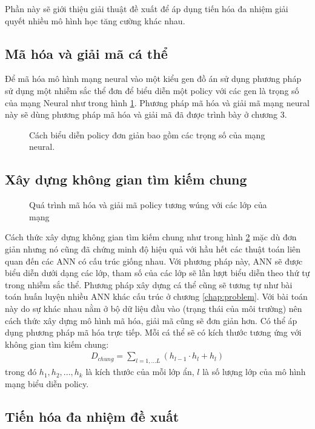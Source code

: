 \label{chap:propose}
Phần này sẽ giới thiệu giải thuật đề xuất để áp dụng tiến hóa đa nhiệm giải quyết nhiều mô hình học tăng cường khác nhau.
\subsection{Mã hóa và giải mã cá thể}
Để mã hóa mô hình mạng neural vào một kiểu gen đồ án sử dụng phương pháp sử dụng một nhiễm sắc thể đơn để biểu diễn một policy với các gen là trọng số của mạng Neural như trong hình \ref{fig:problem:policy}. Phương pháp mã hóa và giải mã mạng neural này sẽ dùng phương pháp mã hóa và giải mã đã được trình bày ở chương 3.
\begin{figure}[ht]
    \centering
    \caption{Cách biểu diễn policy đơn giản bao gồm các trọng số của mạng neural.}
    \label{fig:problem:policy}
\end{figure}


\subsection{Xây dựng không gian tìm kiếm chung}
\begin{figure}[ht]
    \centering
    \caption{Quá trình mã hóa và giải mã policy tương wúng với các lớp của mạng}
    \label{fig:problem:policy-decode}
\end{figure}

Cách thức xây dựng không gian tìm kiếm chung như trong hình \ref{fig:problem:policy-decode} mặc dù đơn giản nhưng nó cũng đã chứng minh độ hiệu quả với hầu hết các thuật toán liên quan đến các ANN có cấu trúc giống nhau. Với phương pháp này, ANN sẽ được biểu diễn dưới dạng các lớp, tham số của các lớp sẽ lần lượt biểu diễn theo thứ tự trong nhiễm sắc thể. Phương pháp xây dựng cá thể cũng sẽ tương tự như bài toán huấn luyện nhiều ANN khác cấu trúc ở chương \ref{chap:problem}. Với bài toán này do sự khác nhau nằm ở bộ dữ liệu đầu vào (trạng thái của môi trường) nên cách thức xây dựng mô hình mã hóa, giải mã cũng sẽ đơn giản hơn. Có thể áp dụng phương pháp mã hóa trực tiếp. Mỗi cá thể sẽ có kích thước tương ứng với không gian tìm kiếm chung:
\begin{align}
    D_{chung} = \sum_{l={1,...L}}(h_{l-1}\cdot h_l + h_l)
    \label{rl:dmulti}
\end{align}
trong đó $h_1,h_2,...,h_k$ là kích thước của mỗi lớp ẩn, $l$ là số lượng lớp của mô hình mạng biểu diễn policy.

\subsection{Tiến hóa đa nhiệm đề xuất}

